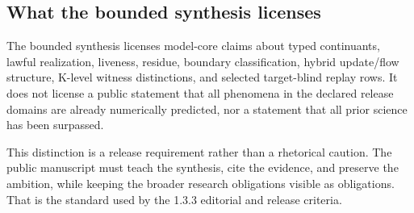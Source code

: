 \subsection{What the bounded synthesis licenses}

The bounded synthesis licenses model-core claims about typed continuants, lawful realization, liveness, residue, boundary classification, hybrid update/flow structure, K-level witness distinctions, and selected target-blind replay rows. It does not license a public statement that all phenomena in the declared release domains are already numerically predicted, nor a statement that all prior science has been surpassed.


This distinction is a release requirement rather than a rhetorical caution. The public manuscript must teach the synthesis, cite the evidence, and preserve the ambition, while keeping the broader research obligations visible as obligations. That is the standard used by the 1.3.3 editorial and release criteria.
